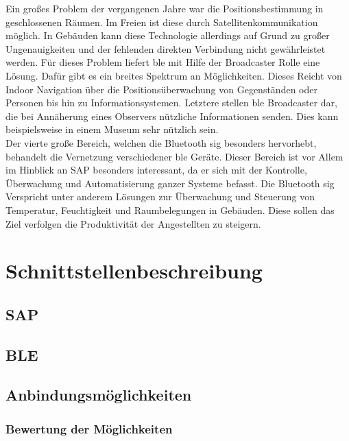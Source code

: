 \noindent Ein großes Problem der vergangenen Jahre war die Positionsbestimmung in geschlossenen Räumen. Im Freien ist diese durch Satellitenkommunikation möglich. In Gebäuden kann diese Technologie allerdings auf Grund zu großer Ungenauigkeiten und der fehlenden direkten Verbindung nicht gewährleistet werden. Für dieses Problem liefert \ac{ble} mit Hilfe der Broadcaster Rolle eine Lösung. Dafür gibt es ein breites Spektrum an Möglichkeiten. Dieses Reicht von Indoor Navigation über die Positionsüberwachung von Gegenständen oder Personen bis hin zu Informationsystemen. Letztere stellen \ac{ble} Broadcaster dar, die bei Annäherung eines Observers nützliche Informationen senden. Dies kann beispielsweise in einem Museum sehr nützlich sein.\\          

\noindent Der vierte große Bereich, welchen die Bluetooth \ac{sig} besonders hervorhebt, behandelt die Vernetzung verschiedener \ac{ble} Geräte. Dieser Bereich ist vor Allem im Hinblick an SAP besonders interessant, da er sich mit der Kontrolle, Überwachung und Automatisierung ganzer Systeme befasst. Die Bluetooth \ac{sig} Verspricht unter anderem Lösungen zur Überwachung und Steuerung von Temperatur, Feuchtigkeit und Raumbelegungen in Gebäuden. Diese sollen das Ziel verfolgen die Produktivität der Angestellten zu steigern.\\   

\section{Schnittstellenbeschreibung}
\label{s:interface} 

\subsection{SAP}
\label{ss:interface:sap}

\subsection{BLE}
\label{ss:interface:ble}

\subsection{Anbindungsmöglichkeiten}
\label{ss:interface:connect}

\subsubsection{Bewertung der Möglichkeiten}
\label{sss:interface:connect:eval}

